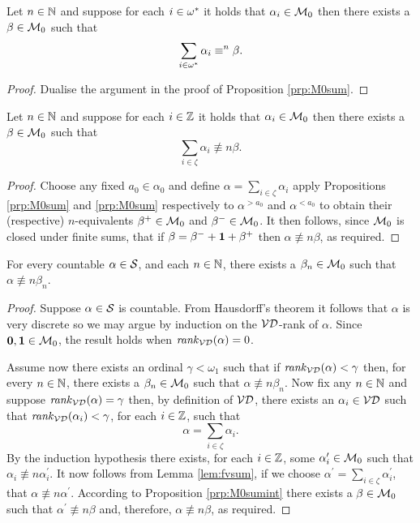 \begin{prp}\label{prp:M0sumop}
	Let $n\in\mathbb{N}$ and suppose for each $i\in{\omega}^\ast$ it holds that $\alpha_i\in\mathcal{M}_0$ then there exists a $\beta\in\mathcal{M}_0$ such that
	\begin{equation}
		\sum_{i\in{\omega}^\ast}\alpha_i\equiv^{n}\beta.
	\end{equation}
\end{prp}
\begin{proof}
	Dualise the argument in the proof of Proposition \ref{prp:M0sum}.
\end{proof}

\begin{prp}\label{prp:M0sumint}
	Let $n\in\mathbb{N}$ and suppose for each $i\in\mathbb{Z}$ it holds that $\alpha_i\in\mathcal{M}_0$ then there exists a $\beta\in\mathcal{M}_0$ such that
	\begin{equation}
		\sum_{i\in\zeta}\alpha_i\nequiv{n}\beta.
	\end{equation}
\end{prp}
\begin{proof}
	Choose any fixed $a_0\in\alpha_0$ and define
	$\alpha=\sum_{i\in\zeta}\alpha_i$ apply Propositions \ref{prp:M0sum} and
	\ref{prp:M0sum} respectively to $\alpha^{>a_0}$ and $\alpha^{<a_0}$ to
	obtain their (respective) $n$-equivalents $\beta^+\in\mathcal{M}_0$ and $\beta^-\in\mathcal{M}_0$.  It then follows, since $\mathcal{M}_0$ is closed under finite sums, that if $\beta=\beta^-+\mathbf{1}+\beta^+$ then $\alpha\nequiv{n}\beta$, as required.
\end{proof}

\begin{thm}
	For every countable $\alpha\in\mathcal{S}$, and each $n\in\mathbb{N}$, there exists a $\beta_n\in\mathcal{M}_0$ such that $\alpha\nequiv{n}\beta_n$.
\end{thm}
\begin{proof}
	Suppose $\alpha\in\mathcal{S}$ is countable.  From Hausdorff's theorem it follows that $\alpha$ is very discrete so we may argue by induction on the $\mathcal{VD}$-rank of $\alpha$. Since $\mathbf{0},\mathbf{1}\in\mathcal{M}_0$, the result holds when $\mathit{rank}_\mathcal{VD}(\alpha)=0$.

	Assume now there exists an ordinal $\gamma<\omega_1$ such that if $\mathit{rank}_\mathcal{VD}(\alpha)<\gamma$ then, for every $n\in\mathbb{N}$, there exists a $\beta_n\in\mathcal{M}_0$ such that $\alpha\nequiv{n}\beta_n$.  Now fix any $n\in\mathbb{N}$ and  suppose $\mathit{rank}_\mathcal{VD}(\alpha)=\gamma$ then, by definition of $\mathcal{VD}$, there exists an $\alpha_i\in\mathcal{VD}$ such that $\mathit{rank}_\mathcal{VD}(\alpha_i)<\gamma$, for each $i\in\mathbb{Z}$, such that
	\begin{equation}
		\alpha=\sum_{i\in\zeta}\alpha_i.
	\end{equation}
	By the induction hypothesis there exists, for each $i\in\mathbb{Z}$, some $\alpha^\prime_i\in\mathcal{M}_0$ such that $\alpha_i\nequiv{n}\alpha_i^\prime$.  It now follows from Lemma \ref{lem:fvsum}, if we choose $\alpha^\prime=\sum_{i\in\zeta}\alpha_i^\prime$, that $\alpha\nequiv{n}\alpha^\prime$.  According to Proposition \ref{prp:M0sumint} there exists a $\beta\in\mathcal{M}_0$ such that $\alpha^\prime\nequiv{n}\beta$ and, therefore, $\alpha\nequiv{n}\beta$, as required.
\end{proof}

